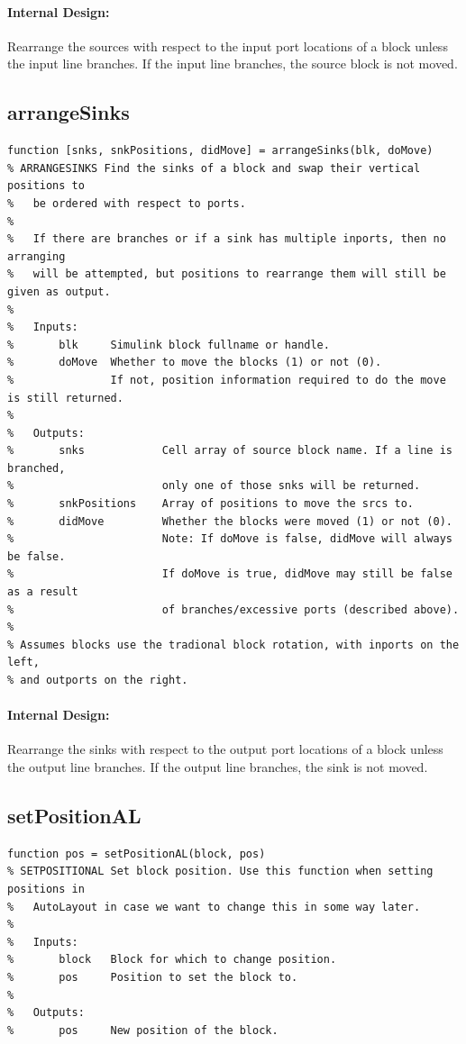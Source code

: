 \documentclass[12pt,letterpaper]{report}
\begin{document}
\paragraph{Internal Design:} Rearrange the sources with respect to the input port locations of a block unless the input line branches. If the input line branches, the source block is not moved.

\subsection{arrangeSinks}
\begin{lstlisting}
function [snks, snkPositions, didMove] = arrangeSinks(blk, doMove)
% ARRANGESINKS Find the sinks of a block and swap their vertical positions to
%   be ordered with respect to ports.
%
%   If there are branches or if a sink has multiple inports, then no arranging
%   will be attempted, but positions to rearrange them will still be given as output.
%
%   Inputs:
%       blk     Simulink block fullname or handle.
%       doMove  Whether to move the blocks (1) or not (0).
%               If not, position information required to do the move is still returned.
%
%   Outputs:
%       snks            Cell array of source block name. If a line is branched,
%                       only one of those snks will be returned.
%       snkPositions    Array of positions to move the srcs to.
%       didMove         Whether the blocks were moved (1) or not (0).
%                       Note: If doMove is false, didMove will always be false.
%                       If doMove is true, didMove may still be false as a result
%                       of branches/excessive ports (described above).
%
% Assumes blocks use the tradional block rotation, with inports on the left,
% and outports on the right.
\end{lstlisting}
\paragraph{Internal Design:} Rearrange the sinks with respect to the output port locations of a block unless the output line branches. If the output line branches, the sink is not moved.

\subsection{setPositionAL}
\begin{lstlisting}
function pos = setPositionAL(block, pos)
% SETPOSITIONAL Set block position. Use this function when setting positions in
%   AutoLayout in case we want to change this in some way later.
%
%   Inputs:
%       block   Block for which to change position.
%       pos     Position to set the block to.
%
%   Outputs:
%       pos     New position of the block.
\end{lstlisting}
\end{document}
